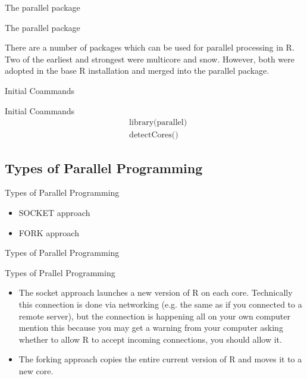 \documentclass{beamer}\usepackage[]{graphicx}\usepackage[]{xcolor}
\begin{document}

\begin{frame}{The parallel package}
    \begin{block}{The parallel package}

      There are a number of packages which can be used for parallel processing in R. Two of the earliest and strongest were multicore and snow. However, both were adopted in the base R installation and merged into the parallel package.  
    \end{block}
    
\end{frame}

\begin{frame}{Initial Coammands}
\begin{block}{Initial Coammands}
    \begin{align*}
        & \text{library(parallel)} \\
        & \text{detectCores()}
    \end{align*}   
\end{block}
\end{frame}


\subsection{Types of Parallel Programming}
\begin{frame}{Types of Parallel Programming}
    \begin{itemize}
        \item SOCKET approach
        \item FORK approach
    \end{itemize}
\end{frame}

\begin{frame}{Types of Parallel Programming}
\begin{block}{Types of Prallel Programming}
\begin{itemize}
    \item The socket approach launches a new version of R on each core. Technically this connection is done via networking (e.g. the same as if you connected to a remote server), 
    but the connection is happening all on your own computer mention this because you may get a warning from your computer asking whether to allow R to accept incoming connections, you should allow it.
    \item The forking approach copies the entire current version of R and moves it to a new core.
\end{itemize}
\end{block}
\end{frame}
\end{document}
